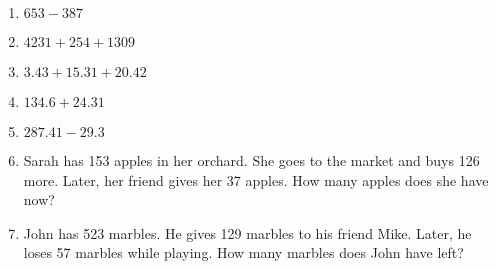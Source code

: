 \documentclass{article}
\begin{document}
\begin{enumerate}
\item \quad \( 653 - 387\)
\vspace{45pt}
\hline
\vspace{5pt}

\item \quad \( 4231 + 254 + 1309\)
\vspace{80pt}
\hline
\vspace{5pt}

\item \quad \( 3.43 + 15.31 + 20.42\)
\vspace{80pt}
\hline
\vspace{5pt}


\item \quad \( 134.6 + 24.31\)
\vspace{75pt}
\hline
\vspace{5pt}

\item \quad \( 287.41 - 29.3 \)
\vspace{80pt}
\hline
\vspace{5pt}

\item \quad Sarah has 153 apples in her orchard. She goes to the market and buys 126 more. Later, her friend gives her 37 apples. How many apples does she have now?
\vspace{80pt}
\hline
\vspace{5pt}

\item \quad John has 523 marbles. He gives 129 marbles to his friend Mike. Later, he loses 57 marbles while playing. How many marbles does John have left?


\end{enumerate}


\end{document}
